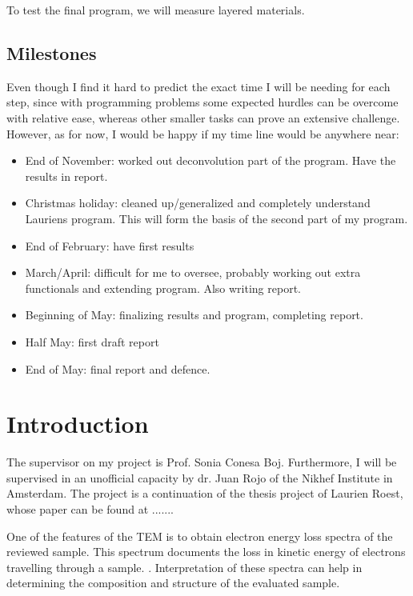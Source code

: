 \documentclass[12pt,a4paper]{article}
\numberwithin{equation}{section}
\numberwithin{figure}{section}
\numberwithin{table}{section}
\begin{document}
To test the final program, we will measure layered materials.

\newpage
\subsection{Milestones}
Even though I find it hard to predict the exact time I will be needing for each step, since with programming problems some expected hurdles can be overcome with relative ease, whereas other smaller tasks can prove an extensive challenge. However, as for now, I would be happy if my time line would be anywhere near:
\begin{itemize}
\item End of November: worked out deconvolution part of the program. Have the results in report.
\item Christmas holiday: cleaned up/generalized and completely understand Lauriens program. This will form the basis of the second part of my program.
\item End of February: have first results
\item March/April: difficult for me to oversee, probably working out extra functionals and extending program. Also writing report.
\item Beginning of May: finalizing results and program, completing report.
\item Half May: first draft report
\item End of May: final report and defence.
\end{itemize}

\section{Introduction}
The supervisor on my project is Prof. Sonia Conesa Boj. Furthermore, I will be supervised in an unofficial capacity by dr. Juan Rojo of the Nikhef Institute in Amsterdam. The project is a continuation of the thesis project of Laurien Roest, whose paper can be found at .......



One of the features of the TEM is to obtain electron energy loss spectra of the reviewed sample. This spectrum documents the loss in kinetic energy of electrons travelling through a sample. \cite{egerton_article}. Interpretation of these spectra can help in determining the composition and structure of the evaluated sample. 
\end{document}
